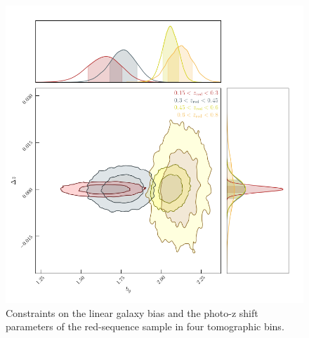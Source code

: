 \documentclass[fleqn,usenatbib,useAMS]{mnras}
\begin{document}
\begin{figure}
\includegraphics[width=\columnwidth]{figures_tmp/joint_estimate_blind.png}
\caption{\label{fig:b_estimate} Constraints on the linear galaxy bias and the photo-z shift parameters of the red-sequence sample in four tomographic bins.} 
\end{figure}










\appendix


\bsp	%
\label{lastpage}
\end{document}
